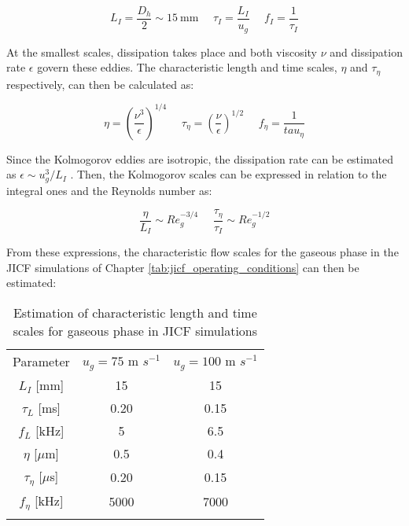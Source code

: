 	\begin{equation}
	L_I = \frac{D_h}{2} \sim 15 ~ \mathrm{mm}  ~~~~~~ \tau_I = \frac{L_I}{u_g} ~~~~~~ f_I = \frac{1}{\tau_I}
	\end{equation}
	
At the smallest scales, dissipation takes place and both viscosity $\nu$ and dissipation rate $\epsilon$ govern these eddies. The characteristic length and time scales, $\eta$ and $\tau_\eta$ respectively, can then be calculated as:

\begin{equation}
\eta = \left( \frac{\nu^3}{\epsilon} \right)^{1/4} ~~~~~~ \tau_\eta = \left( \frac{\nu}{\epsilon} \right)^{1/2} ~~~~~~ f_\eta = \frac{1}{tau_\eta}
\end{equation}

Since the Kolmogorov eddies are isotropic, the dissipation rate can be estimated as $\epsilon \sim u_g^3/L_I$ . Then, the Kolmogorov scales can be expressed in relation to the integral ones and the Reynolds number as:

\begin{equation}
\frac{\eta}{L_I} \sim Re_g^{-3/4} ~~~~~~ \frac{\tau_\eta}{\tau_I} \sim Re_g^{-1/2}
\end{equation}

From these expressions, the characteristic flow scales for the gaseous phase in the JICF simulations of Chapter \ref{tab:jicf_operating_conditions} can then be estimated:

\begin{table}[!h]
\centering
\caption{Estimation of characteristic length and time scales for gaseous phase in JICF simulations}
\begin{tabular}{ccc}
\thickhline
Parameter &  $u_g = 75$ m $s^{-1}$ &  $u_g = 100$ m $s^{-1}$ \\ 
\thickhline
$L_I$ [mm] & 15 & 15 \\
$\tau_L$ [ms] & 0.20 & 0.15 \\
$f_L$ [kHz] & 5 & 6.5 \\
\thickhline
$\eta$ [$\mu$m] & 0.5 & 0.4 \\
$\tau_\eta$ [$\mu$s] & 0.20 & 0.15 \\
$f_\eta$ [kHz] & 5000 & 7000 \\
\thickhline
\end{tabular}
\label{tab:jicf_velocity_profiles_parameters}
\end{table}
